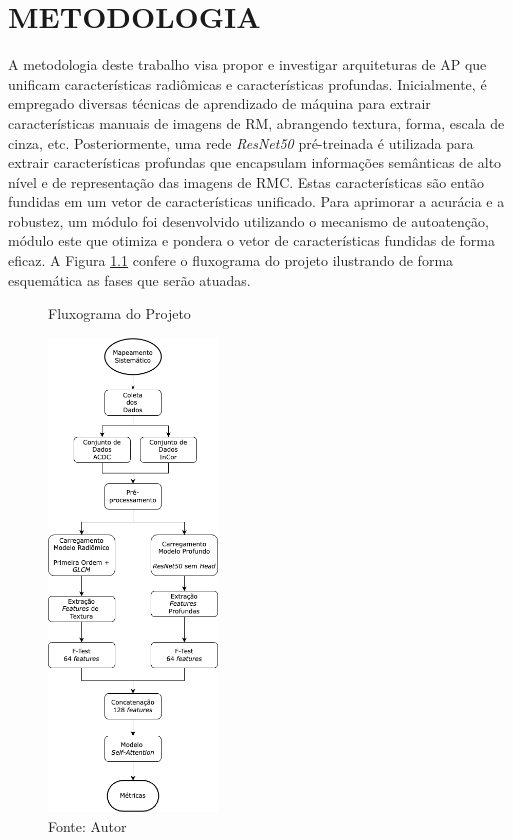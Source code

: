\chapter{METODOLOGIA} 
\label{chap:metodologia}

A metodologia deste trabalho visa propor e investigar arquiteturas de \gls{AP} que unificam características radiômicas e características profundas. Inicialmente, é empregado diversas técnicas de aprendizado de máquina para extrair características manuais de imagens de RM, abrangendo textura, forma, escala de cinza, etc. Posteriormente, uma rede \textit{ResNet50} pré-treinada é utilizada para extrair características profundas que encapsulam informações semânticas de alto nível e de representação das imagens de \gls{RMC}. Estas características são então fundidas em um vetor de características unificado. Para aprimorar a acurácia e a robustez, um módulo foi desenvolvido utilizando o mecanismo de autoatenção, módulo este que otimiza e pondera o vetor de características fundidas de forma eficaz. A Figura \ref{fig:fig015} confere o fluxograma do projeto ilustrando de forma esquemática as fases que serão atuadas.

\begin{figure}[h!]
    \centering
    \caption{Fluxograma do Projeto}
    \includegraphics[width=0.4\textwidth]{figures/fig015.png}
    \caption*{Fonte: Autor}
    \label{fig:fig015}
\end{figure}

